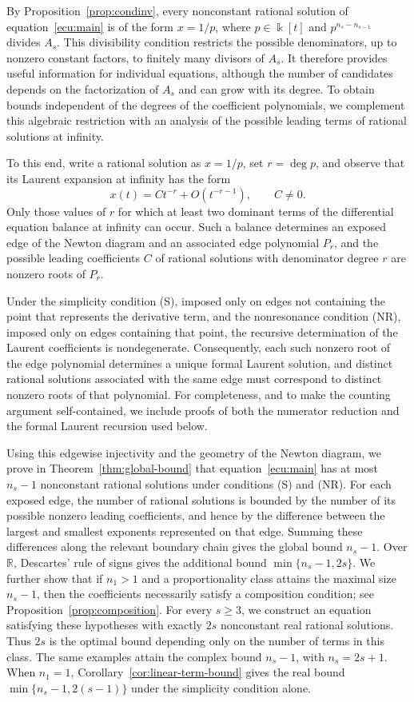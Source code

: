 \documentclass[12pt,a4paper]{amsart}
\numberwithin{theorem}{section}
\theoremstyle{definition}
\begin{document}
	By Proposition~\ref{prop:condinv}, every nonconstant rational solution of equation~\eqref{ecu:main} is of the form $x=1/p$, where $p\in\Bbbk[t]$ and $p^{n_s-n_{s-1}}$ divides $A_s$. This divisibility condition restricts the possible denominators, up to nonzero constant factors, to finitely many divisors of $A_s$. It therefore provides useful information for individual equations, although the number of candidates depends on the factorization of $A_s$ and can grow with its degree. To obtain bounds independent of the degrees of the coefficient polynomials, we complement this algebraic restriction with an analysis of the possible leading terms of rational solutions at infinity.
	
	To this end, write a rational solution as $x=1/p$, set $r=\deg p$, and observe that its Laurent expansion at infinity has the form
	\[
	x(t)=Ct^{-r}+O(t^{-r-1}),\qquad C\neq0.
	\]
	Only those values of $r$ for which at least two dominant terms of the differential equation balance at infinity can occur. Such a balance determines an exposed edge of the Newton diagram and an associated edge polynomial $P_r$, and the possible leading coefficients $C$ of rational solutions with denominator degree $r$ are nonzero roots of $P_r$.
	
	Under the simplicity condition {\rm (S)}, imposed only on edges not containing the point that represents the derivative term, and the nonresonance condition {\rm (NR)}, imposed only on edges containing that point, the recursive determination of the Laurent coefficients is nondegenerate. Consequently, each such nonzero root of the edge polynomial determines a unique formal Laurent solution, and distinct rational solutions associated with the same edge must correspond to distinct nonzero roots of that polynomial. For completeness, and to make the counting argument self-contained, we include proofs of both the numerator reduction and the formal Laurent recursion used below.
	
	Using this edgewise injectivity and the geometry of the Newton diagram, we prove in Theorem~\ref{thm:global-bound} that equation~\eqref{ecu:main} has at most $n_s-1$ nonconstant rational solutions under conditions {\rm (S)} and {\rm (NR)}. For each exposed edge, the number of rational solutions is bounded by the number of its possible nonzero leading coefficients, and hence by the difference between the largest and smallest exponents represented on that edge. Summing these differences along the relevant boundary chain gives the global bound $n_s-1$. Over $\mathbb{R}$, Descartes' rule of signs gives the additional bound $\min\{n_s-1,2s\}$. We further show that if $n_1>1$ and a proportionality class attains the maximal size $n_s-1$, then the coefficients necessarily satisfy a composition condition; see Proposition~\ref{prop:composition}. For every $s\geq3$, we construct an equation satisfying these hypotheses with exactly $2s$ nonconstant real rational solutions. Thus $2s$ is the optimal bound depending only on the number of terms in this class. The same examples attain the complex bound $n_s-1$, with $n_s=2s+1$. When $n_1=1$, Corollary~\ref{cor:linear-term-bound} gives the real bound $\min\{n_s-1,2(s-1)\}$ under the simplicity condition alone.
	
\end{document}
